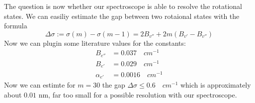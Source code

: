 The question is now whether our spectroscope is able to resolve
the rotational states. We can easiliy estimate the gap between
two rotaional states with the formula
\begin{equation}
    \Delta \sigma := \sigma(m) - \sigma(m-1) = 2 B_{v''} +
    2m(B_{v'} - B_{v''})
\end{equation}
Now we can plugin some literature values for the constants:
\begin{align}
    B_{e''} &= 0.037 \quad  cm^{-1} \\ 
    B_{e'}  &= 0.029 \quad cm^{-1} \\ 
    \alpha_{e'}  &= 0.0016 \quad cm^{-1}
\end{align}
Now we can estimte for $m=30$ the gap
$\Delta \sigma \leqslant 0.6 \quad cm^{-1}$ which is 
approximately about $0.01$ nm, far too small for a possible
resolution with our spectroscope.
